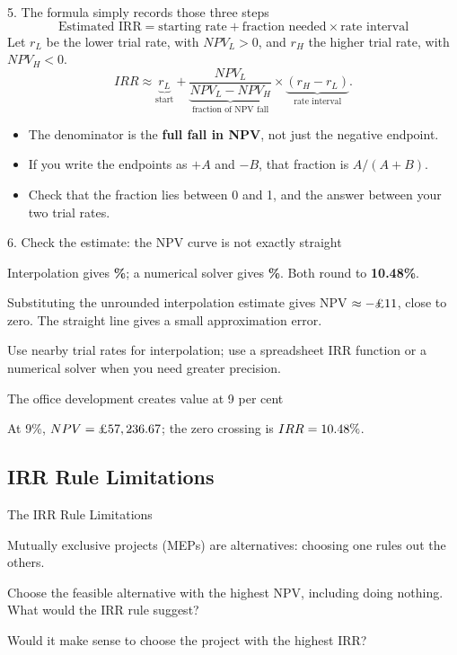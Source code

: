 \documentclass[9pt,aspectratio=169]{beamer}
\newenvironment{wideitemize}{\itemize\addtolength{\itemsep}{10pt}}{\enditemize}
\begin{document}
\begin{frame}{5. The formula simply records those three steps}
\[
\boxed{\text{Estimated IRR}=\text{starting rate}+\text{fraction needed}\times\text{rate interval}}
\]
Let $r_L$ be the lower trial rate, with $NPV_L>0$, and $r_H$ the higher trial rate, with $NPV_H<0$.
\[
IRR\approx
\underbrace{r_L}_{\text{start}}+
\underbrace{\frac{NPV_L}{NPV_L-NPV_H}}_{\text{fraction of NPV fall}}\times
\underbrace{(r_H-r_L)}_{\text{rate interval}}.
\]
\begin{itemize}
\item The denominator is the \textbf{full fall in NPV}, not just the negative endpoint.
\item If you write the endpoints as $+A$ and $-B$, that fraction is $A/(A+B)$.
\item Check that the fraction lies between 0 and 1, and the answer between your two trial rates.
\end{itemize}
\end{frame}

\begin{frame}{6. Check the estimate: the NPV curve is not exactly straight}
\begin{center}\end{center}
Interpolation gives \textbf{\InterpRateFive\%}; a numerical solver gives \textbf{\InterpRootFive\%}. Both round to \textbf{10.48\%}.

Substituting the unrounded interpolation estimate gives NPV $\approx-\text{£}11$, close to zero. The straight line gives a small approximation error.

Use nearby trial rates for interpolation; use a spreadsheet IRR function or a numerical solver when you need greater precision.
\end{frame}

\begin{frame}{The office development creates value at 9 per cent}
\begin{center}\end{center}
At 9\%, $NPV=\text{£}57,236.67$; the zero crossing is $IRR=10.48\%$.
\end{frame}

\subsection{IRR Rule Limitations}

\begin{frame}{The IRR Rule Limitations}
\begin{wideitemize}
\item Mutually exclusive projects (MEPs) are alternatives: choosing one rules out the others.
\item Choose the feasible alternative with the highest NPV, including doing nothing. What would the IRR rule suggest?
\item Would it make sense to choose the project with the highest IRR?
\end{wideitemize}
\end{frame}
\end{document}
